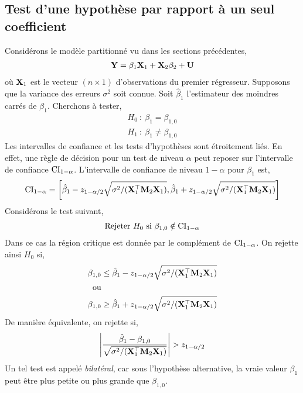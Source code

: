 \subsection{Test d'une hypothèse par rapport à un seul coefficient}
Considérons le modèle partitionné vu dans les sections précédentes,
\begin{align*}
\mathbf Y = \beta_1\mathbf X_1 + \mathbf X_2\beta_2 + \mathbf U
\end{align*}
où $\mathbf X_1$ est le vecteur $(n\times 1)$ d'observations du premier régresseur. Supposons que la variance des erreurs $\sigma^2$ soit connue. Soit $\hat{\beta}_1$ l'estimateur des moindres carrés de $\beta_1$.  Cherchons à tester,
\begin{align}
H_0 \ : \  \beta_1 = \beta_{1, 0}\nonumber\\
H_1 \ : \  \beta_1 \neq \beta_{1, 0}
\label{eq34}
\end{align}
Les intervalles de confiance et les tests d'hypothèses sont étroitement liés. En effet, une règle de décision pour un test de niveau $\alpha$ peut reposer  sur l'intervalle de confiance $\mathrm{CI}_{1-\alpha}$. L'intervalle de confiance de niveau $1-\alpha$ pour $\beta_1$ est,
\begin{align*}
\mathrm{CI}_{1-\alpha} = \left[ \hat{\beta}_1 - z_{1 - \alpha/2}\sqrt{\sigma^2/(\mathbf X_1^\top\mathbf M_2\mathbf X_1)},  \hat{\beta}_1 + z_{1 - \alpha/2}\sqrt{\sigma^2/(\mathbf X_1^\top\mathbf M_2\mathbf X_1)}\right]
\end{align*}
Considérons le test suivant,
\begin{align*}
\textrm{Rejeter} \ H_0 \  \textrm{si} \ \beta_{1,0} \notin \mathrm{CI}_{1-\alpha}
\end{align*}
Dans ce cas la région critique est donnée par le complément de $ \mathrm{CI}_{1-\alpha}$. On rejette ainsi $H_0$ si,
\begin{align*}
\beta_{1,0}&\leq  \hat{\beta}_1 - z_{1 - \alpha/2}\sqrt{\sigma^2/(\mathbf X_1^\top\mathbf M_2\mathbf X_1)}\\
\textrm{ou}&\\
\beta_{1,0}&\geq  \hat{\beta}_1 + z_{1 - \alpha/2}\sqrt{\sigma^2/(\mathbf X_1^\top\mathbf M_2\mathbf X_1)}
\end{align*}
De manière équivalente, on rejette si,
\begin{align}
\left\vert {\frac{\hat{\beta}_1 - \beta_{1,0}}{ \sqrt{\sigma^2/(\mathbf X_1^\top\mathbf M_2\mathbf X_1)}}} \right\vert > z_{1-\alpha/2}
\label{eq35}
\end{align}
Un tel test est appelé \emph{bilatéral}, car sous l'hypothèse alternative, la vraie valeur $\beta_1$ peut être plus petite ou plus grande que $\beta_{1,0}$.\\
